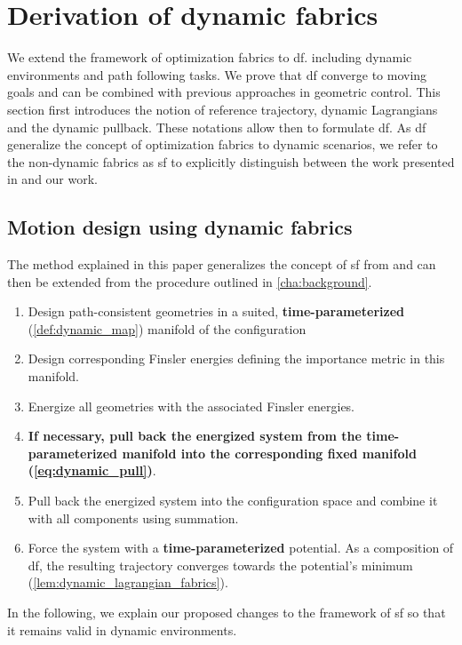 \section{Derivation of dynamic fabrics}%
\label{sec:methods}

We extend the framework of optimization fabrics to \acf{df}.
including
dynamic environments and path following tasks. We prove that \ac{df}
converge to moving goals and can be combined with previous approaches in geometric
control.
%
This section first introduces the notion of reference trajectory, dynamic Lagrangians and
the dynamic pullback. These notations allow then to formulate \ac{df}. 
As \ac{df} generalize the concept of optimization fabrics to dynamic scenarios, we refer 
to the non-dynamic fabrics as \acf{sf} to explicitly distinguish between the work
presented in \cite{Ratliff2020} and our work.

\subsection{Motion design using dynamic fabrics}%
\label{sub:motion_design_using_dynamic_fabrics}

The method explained in this paper generalizes the concept of \ac{sf}
from \cite{Ratliff2020} and can then be extended from the procedure outlined in
\cref{cha:background}.

\begin{enumerate}
  \item Design path-consistent geometries in a suited, \textbf{time-parameterized} (\cref{def:dynamic_map}) manifold of the configuration
  \item Design corresponding Finsler energies defining the importance metric in this manifold.
  \item Energize all geometries with the associated Finsler energies.
  \item \textbf{If necessary, pull back the energized system from the time-parameterized manifold into
    the corresponding fixed manifold (\cref{eq:dynamic_pull})}.
  \item Pull back the energized system into the configuration space and combine it with
    all components using summation.
  \item Force the system with a \textbf{time-parameterized} potential. As a composition of \ac{df}, 
    the resulting trajectory converges towards the potential's minimum (\cref{lem:dynamic_lagrangian_fabrics}).
\end{enumerate}
In the following, we explain our proposed changes to the framework of \ac{sf} so that it remains
valid in dynamic environments.


